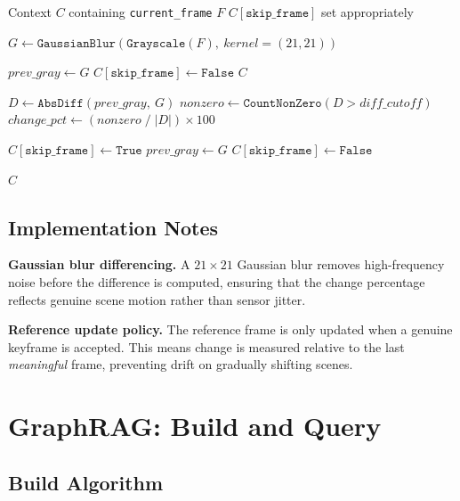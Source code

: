 \begin{algorithm}[H]
\caption{\texttt{AdaptiveKeyframeNode.process(context)}}
\begin{algbox}
\begin{algorithmic}[1]
\Require Context $C$ containing \texttt{current\_frame} $F$
\Ensure $C[\texttt{skip\_frame}]$ set appropriately

\State $G \gets \texttt{GaussianBlur}(\texttt{Grayscale}(F),\ kernel=(21,21))$

    \State $prev\_gray \gets G$
    \State $C[\texttt{skip\_frame}] \gets \texttt{False}$
    \State \Return $C$
\EndIf

\State $D \gets \texttt{AbsDiff}(prev\_gray,\ G)$
\State $nonzero \gets \texttt{CountNonZero}(D > diff\_cutoff)$
\State $change\_pct \gets (nonzero \;/\; |D|) \times 100$

    \State $C[\texttt{skip\_frame}] \gets \texttt{True}$
\Else
    \State $prev\_gray \gets G$
    \State $C[\texttt{skip\_frame}] \gets \texttt{False}$
\EndIf

\State \Return $C$
\end{algorithmic}
\end{algbox}
\end{algorithm}

\subsection{Implementation Notes}

\textbf{Gaussian blur differencing.} A $21\times21$ Gaussian blur removes high-frequency noise before the difference is computed, ensuring that the change percentage reflects genuine scene motion rather than sensor jitter.

\textbf{Reference update policy.} The reference frame is only updated when a genuine keyframe is accepted. This means change is measured relative to the last \textit{meaningful} frame, preventing drift on gradually shifting scenes.

\section{GraphRAG: Build and Query}

\subsection{Build Algorithm}

